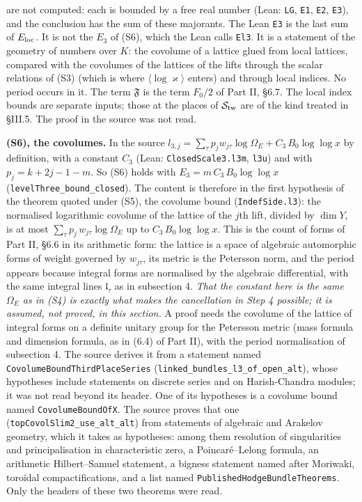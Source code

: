 \documentclass[11pt,letterpaper]{article}
\begin{document}
are not computed: each is bounded by a free real number (Lean: \texttt{LG}, \texttt{E1}, \texttt{E2},
\texttt{E3}), and the conclusion has the sum of these majorants. The Lean \texttt{E3} is the last sum of
$E_{\rm loc}$. It is not the $E_3$ of (S6), which the Lean calls \texttt{El3}.
It is a statement of the geometry of numbers over $K$: the covolume of a lattice glued from local
lattices, compared with the covolumes of the lattices of the lifts through the scalar relations of (S3)
(which is where $\langle\log\varkappa\rangle$ enters) and through local indices. No period occurs in it.
The term $\mathfrak F$ is the term $F_0/2$ of Part II, \S6.7. The local index bounds are separate inputs;
those at the places of $\mathcal S_{\rm tw}$ are of the kind treated in \S III.5. The proof in the source
was not read.

\textbf{(S6), the covolumes.} In the source
$l_{3,j}=\sum_\tau p_jw_{j\tau}\log\Omega_E+C_3\,B_0\log\log x$ by definition, with a constant $C_3$
(Lean: \texttt{ClosedScale3.l3m}, \texttt{l3u}) and with $p_j=k+2j-1-m$. So (S6) holds with
$E_3=m\,C_3\,B_0\log\log x$ (\texttt{levelThree\_bound\_closed}). The content is therefore in the first
hypothesis of the theorem quoted under (S5), the covolume bound (\texttt{IndefSide.l3}): the normalised
logarithmic covolume of the lattice of the $j$th lift, divided by $\dim Y$, is at most
$\sum_\tau p_j\,w_{j\tau}\log\Omega_E$ up to $C_3\,B_0\log\log x$. This is the count of forms of Part II,
\S6.6 in its arithmetic form: the lattice is a space of algebraic automorphic forms of weight governed
by $w_{j\tau}$, its metric is the Petersson norm, and the period appears because integral forms are
normalised by the algebraic differential, with the same integral lines $\mathfrak l_\tau$ as in
subsection 4. \emph{That the constant here is the same $\Omega_E$ as in \textup{(S4)} is exactly what
makes the cancellation in Step 4 possible; it is assumed, not proved, in this section.} A proof needs the
covolume of the lattice of integral forms on a definite unitary group for the Petersson metric (mass
formula and dimension formula, as in (6.4) of Part II), with the period normalisation of subsection 4.
The source derives it from a statement named \texttt{CovolumeBoundThirdPlaceSeries}
(\texttt{linked\_bundles\_l3\_of\_open\_alt}), whose hypotheses include statements on discrete series and
on Harish-Chandra modules; it was not read beyond its header. One of its hypotheses is a covolume bound
named \texttt{CovolumeBoundOfX}. The source proves that one (\texttt{topCovolSlim2\_use\_alt\_alt}) from
statements of algebraic and Arakelov geometry, which it takes as hypotheses: among them resolution of
singularities and principalisation in characteristic zero, a Poincar\'e--Lelong formula, an arithmetic
Hilbert--Samuel statement, a bigness statement named after Moriwaki, toroidal compactifications, and a
list named \texttt{PublishedHodgeBundleTheorems}. Only the headers of these two theorems were read.
\end{document}
